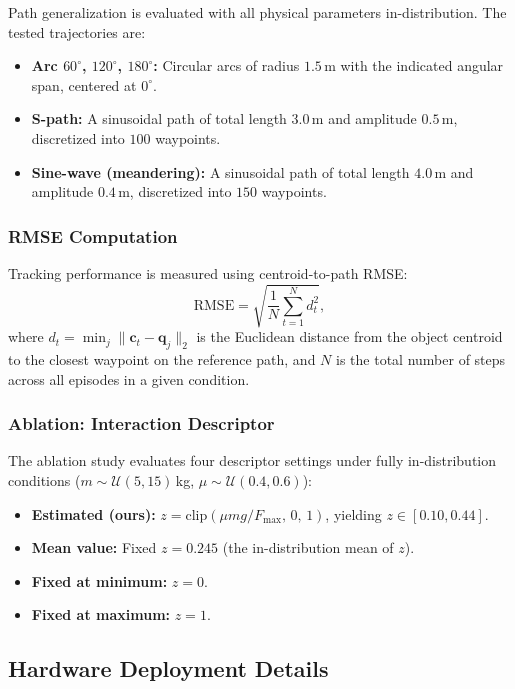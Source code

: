 Path generalization is evaluated with all physical parameters in-distribution.
The tested trajectories are:
\begin{itemize}
    \item \textbf{Arc $60^\circ$, $120^\circ$, $180^\circ$:} Circular arcs of radius $1.5$\,m with the indicated angular span, centered at $0^\circ$.
    \item \textbf{S-path:} A sinusoidal path of total length $3.0$\,m and amplitude $0.5$\,m, discretized into $100$ waypoints.
    \item \textbf{Sine-wave (meandering):} A sinusoidal path of total length $4.0$\,m and amplitude $0.4$\,m, discretized into $150$ waypoints.
\end{itemize}

\subsubsection{RMSE Computation}

Tracking performance is measured using centroid-to-path RMSE:
%
\begin{equation}
    \mathrm{RMSE} = \sqrt{\frac{1}{N} \sum_{t=1}^{N} d_t^2},
\end{equation}
%
where $d_t = \min_{j} \| \mathbf{c}_t - \mathbf{q}_j \|_2$ is the Euclidean distance from the object centroid to the closest waypoint on the reference path, and $N$ is the total number of steps across all episodes in a given condition.

\subsubsection{Ablation: Interaction Descriptor}

The ablation study evaluates four descriptor settings under fully in-distribution conditions ($m \sim \mathcal{U}(5, 15)$\,kg, $\mu \sim \mathcal{U}(0.4, 0.6)$):
\begin{itemize}
    \item \textbf{Estimated (ours):} $z = \mathrm{clip}(\mu m g / F_{\max},\, 0,\, 1)$, yielding $z \in [0.10, 0.44]$.
    \item \textbf{Mean value:} Fixed $z = 0.245$ (the in-distribution mean of $z$).
    \item \textbf{Fixed at minimum:} $z = 0$.
    \item \textbf{Fixed at maximum:} $z = 1$.
\end{itemize}

\subsection{Hardware Deployment Details}
\label{app:hardware}

